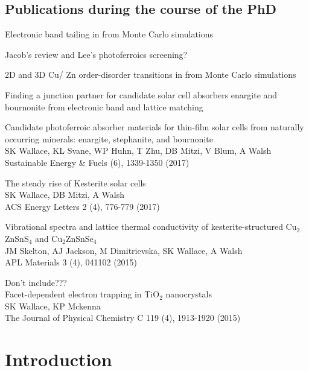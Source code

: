 \documentclass[11pt, twoside]{report}
\begin{document}
\section*{Publications during the course of the PhD}
\begin{etaremune}
\item Electronic band tailing in {\CZTS} from Monte Carlo simulations
\item Jacob's review and Lee's photoferroics screening?
\item 2D and 3D Cu/ Zn order-disorder transitions in {\CZTS} from Monte Carlo simulations
\item Finding a junction partner for candidate solar cell absorbers enargite and bournonite from electronic band and lattice matching
\item Candidate photoferroic absorber materials for thin-film solar cells from naturally occurring minerals: enargite, stephanite, and bournonite\\
SK Wallace, KL Svane, WP Huhn, T Zhu, DB Mitzi, V Blum, A Walsh\\ Sustainable Energy \& Fuels  (6), 1339-1350 (2017)
\item The steady rise of Kesterite solar cells\\ SK Wallace, DB Mitzi, A Walsh\\ ACS Energy Letters 2 (4), 776-779 (2017)
\item Vibrational spectra and lattice thermal conductivity of kesterite-structured Cu$_2$ZnSnS$_4$ and Cu$_2$ZnSnSe$_4$\\ JM Skelton, AJ Jackson, M Dimitrievska, SK Wallace, A Walsh\\ APL Materials 3 (4), 041102 (2015)
\item Don't include???\\ Facet-dependent electron trapping in TiO$_2$ nanocrystals\\ SK Wallace, KP Mckenna\\ The Journal of Physical Chemistry C 119 (4), 1913-1920 (2015)
\end{etaremune}


\tableofcontents
{}
\listoffigures
{}
\listoftables
{}



\chapter{Introduction}
\setcounter{page}{1}
\end{document}
